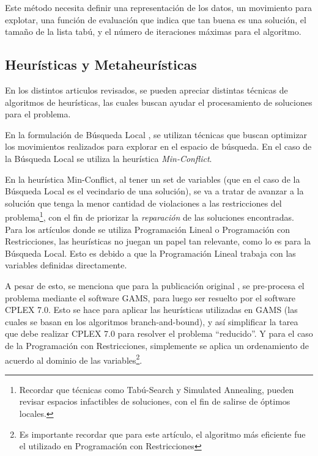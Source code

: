 \documentclass[letter, 10pt]{article}
\begin{document}
Este método necesita definir una representación de los datos, un movimiento para explotar, una función de evaluación que indica que tan buena es una solución, el tamaño de la lista tabú, y el número de iteraciones máximas para el algoritmo.

\subsection{Heurísticas y Metaheurísticas}
En los distintos articulos revisados, se pueden apreciar distintas técnicas de algoritmos de heurísticas, las cuales buscan ayudar el procesamiento de soluciones para el problema.

En la formulación de Búsqueda Local \cite{LocalSearch, PseudoLocal}, se utilizan técnicas que buscan optimizar los movimientos realizados para explorar en el espacio de búsqueda. En el caso de la Búsqueda Local se utiliza la heurística \textit{Min-Conflict}\cite{LocalSearch}.

En la heurística Min-Conflict, al tener un set de variables (que en el caso de la Búsqueda Local es el vecindario de una solución), se va a tratar de avanzar a la solución que tenga la menor cantidad de violaciones a las restricciones del problema\footnote{Recordar que técnicas como Tabú-Search y Simulated Annealing, pueden revisar espacios infactibles de soluciones, con el fin de salirse de óptimos locales.}, con el fin de priorizar la \textit{reparación} de las soluciones encontradas\cite{MinConflicts}.\\

Para los artículos donde se utiliza Programación Lineal o Programación con Restricciones, las heurísticas no juegan un papel tan relevante, como lo es para la Búsqueda Local. Esto es debido a que la Programación Lineal trabaja con las variables definidas directamente.

A pesar de esto, se menciona que para la publicación original \cite{FirstPublication}, se pre-procesa el problema mediante el software GAMS, para luego ser resuelto por el software CPLEX 7.0. Esto se hace para aplicar las heurísticas utilizadas en GAMS (las cuales se basan en los algoritmos branch-and-bound), y así simplificar la tarea que debe realizar CPLEX 7.0 para resolver el problema ``reducido''. Y para el caso de la Programación con Restricciones, simplemente se aplica un ordenamiento de acuerdo al dominio de las variables\footnote{Es importante recordar que para este artículo, el algoritmo más eficiente fue el utilizado en Programación con Restricciones}.\\
\end{document}
